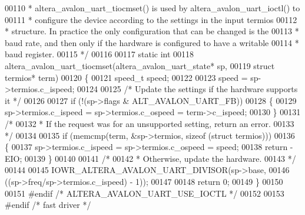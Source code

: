 \begin{DoxyCode}
00110 \textcolor{comment}{ * altera\_avalon\_uart\_tiocmset() is used by altera\_avalon\_uart\_ioctl() to }
00111 \textcolor{comment}{ * configure the device according to the settings in the input termios }
00112 \textcolor{comment}{ * structure. In practice the only configuration that can be changed is the}
00113 \textcolor{comment}{ * baud rate, and then only if the hardware is configured to have a writable}
00114 \textcolor{comment}{ * baud register.}
00115 \textcolor{comment}{ */}
00116 
00117 \textcolor{keyword}{static} \textcolor{keywordtype}{int} 
00118 altera\_avalon\_uart\_tiocmset(altera_avalon_uart_state* sp,
00119   \textcolor{keyword}{struct} termios* term)
00120 \{
00121   speed_t speed;
00122 
00123   speed = sp->termios.c\_ispeed;
00124 
00125   \textcolor{comment}{/* Update the settings if the hardware supports it */}
00126 
00127   \textcolor{keywordflow}{if} (!(sp->flags & ALT_AVALON_UART_FB))
00128   \{
00129     sp->termios.c\_ispeed = sp->termios.c\_ospeed = term->c_ispeed;
00130   \}
00131   \textcolor{comment}{/* }
00132 \textcolor{comment}{   * If the request was for an unsupported setting, return an error.}
00133 \textcolor{comment}{   */}
00134 
00135   \textcolor{keywordflow}{if} (memcmp(term, &sp->termios, sizeof (\textcolor{keyword}{struct} termios)))
00136   \{
00137     sp->termios.c\_ispeed = sp->termios.c\_ospeed = speed;
00138     \textcolor{keywordflow}{return} -EIO;
00139   \}
00140 
00141   \textcolor{comment}{/*}
00142 \textcolor{comment}{   * Otherwise, update the hardware.}
00143 \textcolor{comment}{   */}
00144   
00145   IOWR_ALTERA_AVALON_UART_DIVISOR(sp->base, 
00146     ((sp->freq/sp->termios.c\_ispeed) - 1));
00147 
00148   \textcolor{keywordflow}{return} 0;
00149 \}
00150 
00151 \textcolor{preprocessor}{#endif }\textcolor{comment}{/* ALTERA\_AVALON\_UART\_USE\_IOCTL */}\textcolor{preprocessor}{}
00152 
00153 \textcolor{preprocessor}{#endif }\textcolor{comment}{/* fast driver */}\textcolor{preprocessor}{}
\end{DoxyCode}
